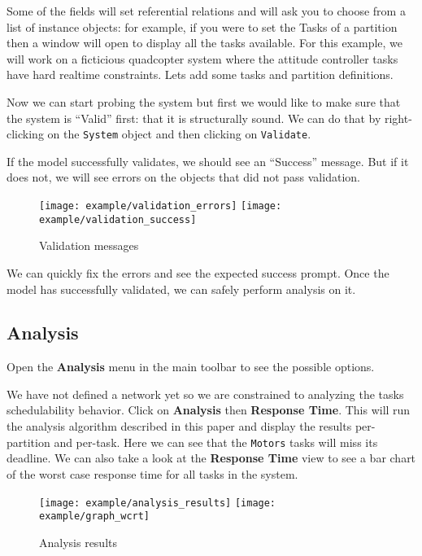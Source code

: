 Some of the fields will set referential relations and will ask
you to choose from a list of instance objects: for example, if you
were to set the Tasks of a partition then a window will open to display
all the tasks available. For this example, we will work on a ficticious quadcopter system where
the attitude controller tasks have hard realtime constraints.
Lets add some tasks and partition definitions. 

Now we can start probing the system but first we would like to make sure that
the system is ``Valid'' first: that it is structurally sound. We can
do that by right-clicking on the \texttt{System} object and 
then clicking on \texttt{Validate}.

If the model successfully validates, we should see an ``Success''
message. But if it does not, we will see errors on the objects
that did not pass validation.
\begin{figure}[H]
    \centering
    \texttt{[image: example/validation\_errors]}
    \texttt{[image: example/validation\_success]}
    \caption{Validation messages}
\end{figure}

We can quickly fix the errors and see the expected success prompt.
Once the model has successfully validated, we can safely perform
analysis on it.
\subsection{Analysis}
Open the \textbf{Analysis} menu in the main
toolbar to see the possible options.

We have not defined a network yet so we are constrained to analyzing
the tasks schedulability behavior.
Click on \textbf{Analysis} then \textbf{Response Time}.
This will run the analysis algorithm described in this paper
and display the results per-partition and per-task.
Here we can see that the \texttt{Motors} tasks will miss its deadline.
We can also take a look at the \textbf{Response Time} view to see
a bar chart of the worst case response time for all tasks in the system.
\begin{figure}[H]
    \centering
    \texttt{[image: example/analysis\_results]}
    \texttt{[image: example/graph\_wcrt]}
    \caption{Analysis results}
\end{figure}

